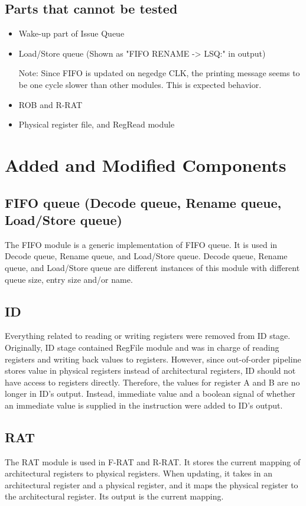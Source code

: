 \documentclass[a4paper,11pt]{article}
\begin{document}
\subsection{Parts that cannot be tested}
\begin{itemize}
  \item Wake-up part of Issue Queue
  \item Load/Store queue (Shown as "FIFO RENAME -> LSQ:" in output)
    \begin{sloppypar}
      Note: Since FIFO is updated on negedge CLK, the printing message seems to be one cycle slower than other modules. This is expected behavior.
    \end{sloppypar}
  \item ROB and R-RAT
  \item Physical register file, and RegRead module
\end{itemize}

\section{Added and Modified Components}
\subsection{FIFO queue (Decode queue, Rename queue, Load/Store queue)}
The FIFO module is a generic implementation of FIFO queue. It is used in Decode queue, Rename queue, and Load/Store queue. Decode queue, Rename queue, and Load/Store queue are different instances of this module with different queue size, entry size and/or name.

\subsection{ID}
Everything related to reading or writing registers were removed from ID stage. Originally, ID stage contained RegFile module and was in charge of reading registers and writing back values to registers. However, since out-of-order pipeline stores value in physical registers instead of architectural registers, ID should not have access to registers directly. Therefore, the values for register A and B are no longer in ID's output. Instead, immediate value and a boolean signal of whether an immediate value is supplied in the instruction were added to ID's output.

\subsection{RAT}
The RAT module is used in F-RAT and R-RAT. It stores the current mapping of architectural registers to physical registers. When updating, it takes in an architectural register and a physical register, and it maps the physical register to the architectural register. Its output is the current mapping.
\end{document}
